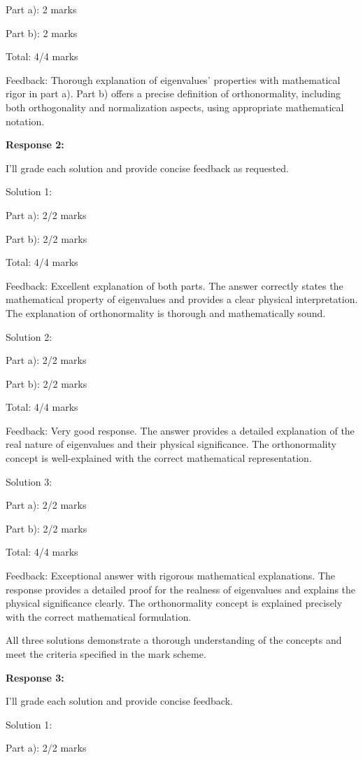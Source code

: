 \documentclass[a4paper,11pt]{article}
\begin{document}
Part a): 2 marks

Part b): 2 marks

Total: 4/4 marks

Feedback: Thorough explanation of eigenvalues' properties with mathematical rigor in part a). Part b) offers a precise definition of orthonormality, including both orthogonality and normalization aspects, using appropriate mathematical notation.

\bigskip   
\textbf{Response 2:}

I'll grade each solution and provide concise feedback as requested.

Solution 1:

Part a): 2/2 marks

Part b): 2/2 marks

Total: 4/4 marks

Feedback: Excellent explanation of both parts. The answer correctly states the mathematical property of eigenvalues and provides a clear physical interpretation. The explanation of orthonormality is thorough and mathematically sound.

Solution 2:

Part a): 2/2 marks

Part b): 2/2 marks

Total: 4/4 marks

Feedback: Very good response. The answer provides a detailed explanation of the real nature of eigenvalues and their physical significance. The orthonormality concept is well-explained with the correct mathematical representation.

Solution 3:

Part a): 2/2 marks

Part b): 2/2 marks

Total: 4/4 marks

Feedback: Exceptional answer with rigorous mathematical explanations. The response provides a detailed proof for the realness of eigenvalues and explains the physical significance clearly. The orthonormality concept is explained precisely with the correct mathematical formulation.

All three solutions demonstrate a thorough understanding of the concepts and meet the criteria specified in the mark scheme.

\bigskip   
\textbf{Response 3:}

I'll grade each solution and provide concise feedback.

Solution 1:

Part a): 2/2 marks
\end{document}
